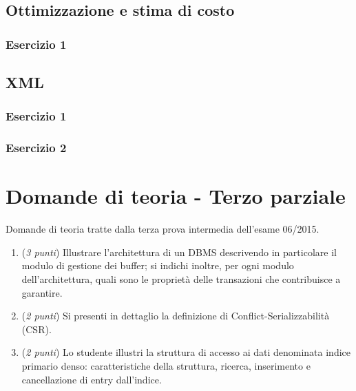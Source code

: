 \documentclass[a4paper]{article}
\begin{document}
	\subsection{Ottimizzazione e stima di costo}
	
	\subsubsection{Esercizio 1}
	
	\subsection{XML}
	
	\subsubsection{Esercizio 1}
	
	\subsubsection{Esercizio 2}

	\section{Domande di teoria - Terzo parziale}
	
	Domande di teoria tratte dalla terza prova intermedia dell'esame 06/2015.
	\begin{enumerate}
		\item (\emph{3 punti}) Illustrare l'architettura di un DBMS descrivendo in particolare il modulo di gestione dei buffer; si indichi inoltre, per ogni modulo dell'architettura, quali sono le proprietà delle transazioni che contribuisce a garantire.
		
		\item (\emph{2 punti}) Si presenti in dettaglio la definizione di Conflict-Serializzabilità (CSR).
		
		\item (\emph{2 punti}) Lo studente illustri la struttura di accesso ai dati denominata indice primario denso: caratteristiche della struttura, ricerca, inserimento e cancellazione di entry dall'indice.
	\end{enumerate}\newpage
	
\end{document}

